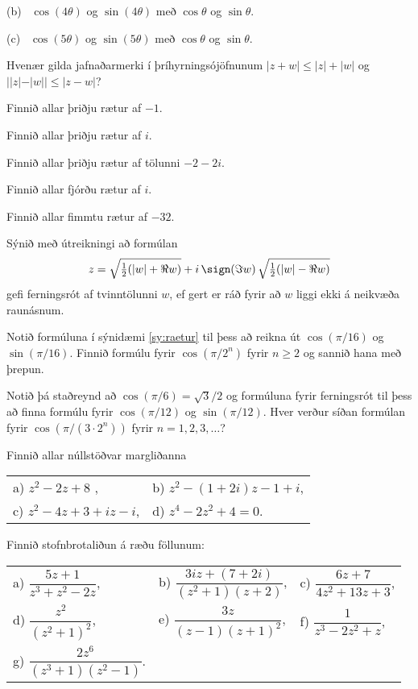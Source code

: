 \smallskip\noindent
(b) \ $\cos(4\theta)$  
og $\sin (4\theta)$ með  $\cos\theta$ og $\sin \theta$.

\smallskip\noindent
(c) \ $\cos(5\theta)$  
og $\sin (5\theta)$ með  $\cos\theta$ og $\sin \theta$.



\daemi Hvenær gilda jafnaðarmerki í þríhyrningsójöfnunum  
$|z+w| \leq  |z| + |w|$
og $||z|-|w||\leq |z-w|$?


\daemi Finnið allar þriðju rætur af $-1$.

\daemi Finnið allar þriðju rætur af $i$.

\daemi Finnið allar þriðju rætur af tölunni $-2-2i$.

\daemi Finnið allar fjórðu rætur af $i$.

\daemi Finnið allar fimmtu rætur af $-32$.


\daemi Sýnið með útreikningi að formúlan
$$
z=\sqrt{\tfrac 12(|w|+\Re w)}+i\, \sign(\Im w)\, \sqrt{\tfrac
12(|w|-\Re w)}
$$
gefi ferningsrót af tvinntölunni $w$, ef gert er ráð fyrir að 
$w$ liggi ekki á neikvæða raunásnum.


\daemi Notið formúluna í sýnidæmi \ref{sy:raetur}
til þess að reikna út $\cos(\pi/16)$ og $\sin( \pi/16)$.
Finnið formúlu fyrir $\cos(\pi/2^n)$ fyrir $n\geq 2$ og sannið hana með
þrepun.

\daemi Notið þá staðreynd að $\cos(\pi/6)=\sqrt 3/2$ og formúluna fyrir ferningsrót
til þess að finna formúlu fyrir $\cos(\pi/12)$ og $\sin( \pi/12)$.
Hver verður síðan formúlan fyrir $\cos(\pi/(3\cdot 2^n))$ fyrir
$n=1,2,3,\dots$? 

\daemi Finnið allar núllstöðvar margliðanna 



\begin{tabular}{ll}
a) $z^2-2z+8$ ,
&b) $z^2-(1+2i)z-1+i$,\\
c) $z^2-4z+3+iz-i$,
&d) $z^4 - 2z^2 + 4=0$.\\ 
\end{tabular}


\daemi Finnið stofnbrotaliðun á ræðu föllunum:

\begin{tabular}{lll}
a) $\dfrac{5z+1}{z^3+z^2-2z}$, 
&b) $\dfrac{3iz+(7+2i)}{(z^2+1)(z+2)}$,
&c) $\dfrac{6z+7}{4z^2+13z+3}$,\\
d) $\dfrac{z^2}{(z^2+1)^2}$,
&e) $\dfrac {3z}{(z-1)(z+1)^2}$,
&f) $\dfrac{1}{z^3-2z^2+z}$,\\
g) $\dfrac{2z^6}{(z^3+1)(z^2-1)}$.\\
\end{tabular}

